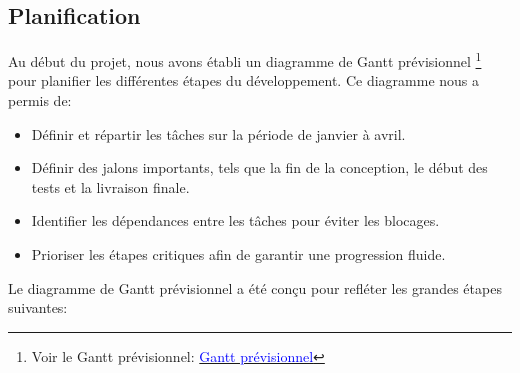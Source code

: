 \documentclass[11pt,a4paper]{article}
\begin{document}
\subsection{Planification}
Au début du projet, nous avons établi un diagramme de Gantt prévisionnel \footnote{Voir le Gantt prévisionnel: \href{https://docs.google.com/spreadsheets/d/1jvVkITa50-fjbtQPN5y54wZTgIkTPtt-_RPIWB4DkVM/edit?usp=sharing}{\textcolor{blue}{Gantt prévisionnel}}} pour planifier les différentes étapes du développement. Ce diagramme nous a permis de:
\begin{itemize}
    \item Définir et répartir les tâches sur la période de janvier à avril.
    \item Définir des jalons importants, tels que la fin de la conception, le début des tests et la livraison finale.
    \item Identifier les dépendances entre les tâches pour éviter les blocages.
    \item Prioriser les étapes critiques afin de garantir une progression fluide.
\end{itemize}
Le diagramme de Gantt prévisionnel a été conçu pour refléter les grandes étapes suivantes:
\end{document}
